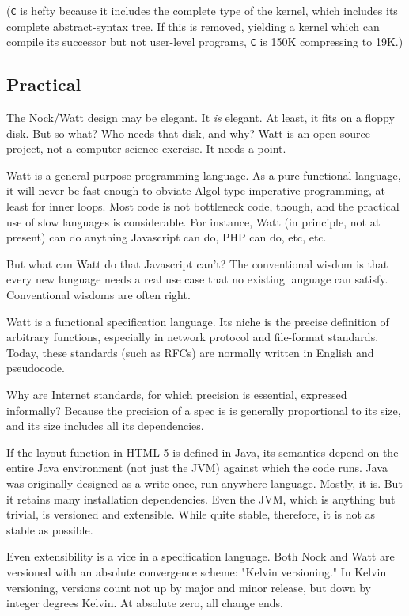 \documentclass[10pt, nocopyrightspace]{sigplanconf}
\begin{document}
(\verb|C| is hefty because it
includes the complete type of the kernel, which includes its
complete abstract-syntax tree.  If this is removed, yielding 
a kernel which can compile its successor but not user-level
programs, \verb|C| is 150K compressing to 19K.)

\subsection{Practical}

The Nock/Watt design may be elegant.  It \emph{is} elegant.  At least,
it fits on a floppy disk.  But so what?  Who needs that disk, and
why?  Watt is an open-source project, not a computer-science
exercise.  It needs a point.

Watt is a general-purpose programming language.  As a pure
functional language, it will never be fast enough to obviate
Algol-type imperative programming, at least for inner loops.
Most code is not bottleneck code, though, and the practical use
of slow languages is considerable.  For instance, Watt (in
principle, not at present) can do anything Javascript can do,
PHP can do, etc, etc.

But what can Watt do that Javascript can't?  The conventional
wisdom is that every new language needs a real use case that no
existing language can satisfy.  Conventional wisdoms are often right.

Watt is a functional specification language.  Its niche is the
precise definition of arbitrary functions, especially in network
protocol and file-format standards.  Today, these standards (such
as RFCs) are normally written in English and pseudocode.

Why are Internet standards, for which precision is essential,
expressed informally?  Because the precision of a spec is 
is generally proportional to its size, and its size includes 
all its dependencies.

If the layout function in HTML 5 is defined in Java, its
semantics depend on the entire Java environment (not just the
JVM) against which the code runs.  Java was originally designed
as a write-once, run-anywhere language.  Mostly, it is.  But it
retains many installation dependencies.  Even the JVM, which is
anything but trivial, is versioned and extensible.  While quite
stable, therefore, it is not as stable as possible.
 
Even extensibility is a vice in a specification language.  Both
Nock and Watt are versioned with an absolute convergence scheme:
"Kelvin versioning."  In Kelvin versioning, versions count not up
by major and minor release, but down by integer degrees Kelvin.
At absolute zero, all change ends.
\end{document}
